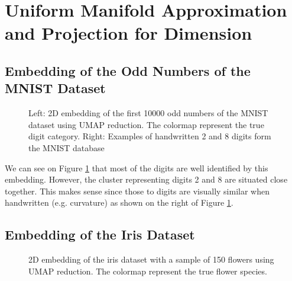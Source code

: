 \documentclass[paper=a4, fontsize=11pt]{scrartcl}
\numberwithin{equation}{section}		%
\numberwithin{figure}{section}			%
\numberwithin{table}{section}				%
\begin{document}
\section{Uniform Manifold Approximation and Projection for Dimension}
\subsection{Embedding of the Odd Numbers of the MNIST Dataset}

\begin{figure}[!hbt]
\begin{center}
\end{center}
\caption{Left: 2D embedding of the first 10000 odd numbers of the MNIST dataset using UMAP reduction. The colormap represent the true digit category. Right: Examples of handwritten 2 and 8 digits form the MNIST database}
\label{fig:Odd}
\end{figure}
We can see on Figure \ref{fig:Odd} that most of the digits are well identified by this embedding. However, the cluster representing digits 2 and 8 are situated close together. This makes sense since those to digits are visually similar when handwritten (e.g. curvature) as shown on the right of Figure \ref{fig:Odd}.

\subsection{Embedding of the Iris Dataset}
\begin{figure}[!hbt]
\begin{center}
\end{center}
\caption{2D embedding of the iris dataset with a sample of 150 flowers using UMAP reduction. The colormap represent the true flower species.}
\label{fig:iris}
\end{figure}
\end{document}
